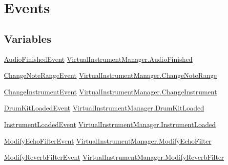 \hypertarget{group___v_i_m_events}{}\section{Events}
\label{group___v_i_m_events}
\subsection*{Variables}
\begin{DoxyCompactItemize}
\item 
\hyperlink{group___v_i_m_event_types_class_virtual_instrument_manager_1_1_audio_finished_event}{Audio\+Finished\+Event} \hyperlink{group___v_i_m_events_ga39ffa8215ab5c9ad46c563e2bd87c219}{Virtual\+Instrument\+Manager.\+Audio\+Finished}
\item 
\hyperlink{group___v_i_m_event_types_class_virtual_instrument_manager_1_1_change_note_range_event}{Change\+Note\+Range\+Event} \hyperlink{group___v_i_m_events_gab6fa99d08e8466406835b9fc4ff859f1}{Virtual\+Instrument\+Manager.\+Change\+Note\+Range}
\item 
\hyperlink{group___v_i_m_event_types_class_virtual_instrument_manager_1_1_change_instrument_event}{Change\+Instrument\+Event} \hyperlink{group___v_i_m_events_ga1b9f12a73a5418ea5695d38b78c506c4}{Virtual\+Instrument\+Manager.\+Change\+Instrument}
\item 
\hyperlink{group___v_i_m_event_types_class_virtual_instrument_manager_1_1_drum_kit_loaded_event}{Drum\+Kit\+Loaded\+Event} \hyperlink{group___v_i_m_events_ga2dea060b2fba524166433300113dc281}{Virtual\+Instrument\+Manager.\+Drum\+Kit\+Loaded}
\item 
\hyperlink{group___v_i_m_event_types_class_virtual_instrument_manager_1_1_instrument_loaded_event}{Instrument\+Loaded\+Event} \hyperlink{group___v_i_m_events_gad79b789b020d7e4a8c149ec653c0b97f}{Virtual\+Instrument\+Manager.\+Instrument\+Loaded}
\item 
\hyperlink{group___v_i_m_event_types_class_virtual_instrument_manager_1_1_modify_echo_filter_event}{Modify\+Echo\+Filter\+Event} \hyperlink{group___v_i_m_events_ga112ed15f48fd261f1ad71c3c953c0a58}{Virtual\+Instrument\+Manager.\+Modify\+Echo\+Filter}
\item 
\hyperlink{group___v_i_m_event_types_class_virtual_instrument_manager_1_1_modify_reverb_filter_event}{Modify\+Reverb\+Filter\+Event} \hyperlink{group___v_i_m_events_gaadd137e073cb3849f610a46e0d032858}{Virtual\+Instrument\+Manager.\+Modify\+Reverb\+Filter}
\item 

\end{DoxyCompactItemize}

